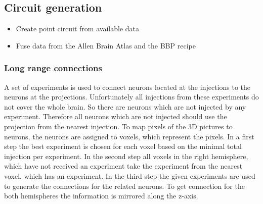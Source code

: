 \documentclass[a4paper]{article}
\begin{document}
\newpage
\subsection{Circuit generation}
\begin{itemize}
      \item Create point circuit from available data
      \item Fuse data from the Allen Brain Atlas and the BBP recipe
   \end{itemize}

\subsubsection{Long range connections}
A set of experiments is used to connect neurons located at the injections
to the neurons at the projections. Unfortunately all injections from these experiments do not
cover the whole brain. So there are neurons which are not injected
by any experiment. Therefore all neurons which are not injected should use the projection
from the nearest injection. To map pixels of the 3D pictures to neurons, the neurons are assigned to voxels, which represent the pixels. In a first step the best experiment is chosen for each voxel based on the minimal total injection per experiment. In the second step all voxels in the right hemisphere, which have not received an experiment take the experiment from the nearest voxel, which has an experiment. In the third step the given experiments are used to generate the connections for the related neurons. To get connection for the both hemispheres the information is mirrored along the z-axis.
\end{document}
